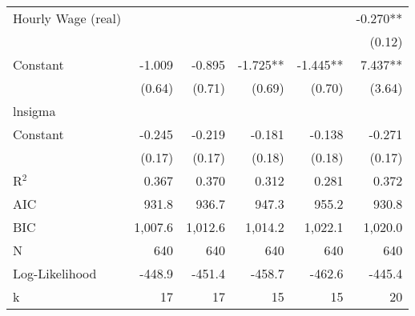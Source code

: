 {\begin{tabular}{l*{5}{r}}
Hourly Wage (real)  &               &               &               &               &      -0.270** \\
                    &               &               &               &               &      (0.12)   \\
Constant               &      -1.009   &      -0.895   &      -1.725** &      -1.445** &       7.437** \\
                    &      (0.64)   &      (0.71)   &      (0.69)   &      (0.70)   &      (3.64)   \\
\hline
lnsigma             &               &               &               &               &               \\
Constant               &      -0.245   &      -0.219   &      -0.181   &      -0.138   &      -0.271   \\
                    &      (0.17)   &      (0.17)   &      (0.18)   &      (0.18)   &      (0.17)   \\
\hline
R$^2$                  &       0.367   &       0.370   &       0.312   &       0.281   &       0.372   \\
AIC                 &       931.8   &       936.7   &       947.3   &       955.2   &       930.8   \\
BIC                 &     1,007.6   &     1,012.6   &     1,014.2   &     1,022.1   &     1,020.0   \\
N                   &         640   &         640   &         640   &         640   &         640   \\
Log-Likelihood                  &      -448.9   &      -451.4   &      -458.7   &      -462.6   &      -445.4   \\
k                   &          17   &          17   &          15   &          15   &          20   \\
\hline\hline
\end{tabular}
}
